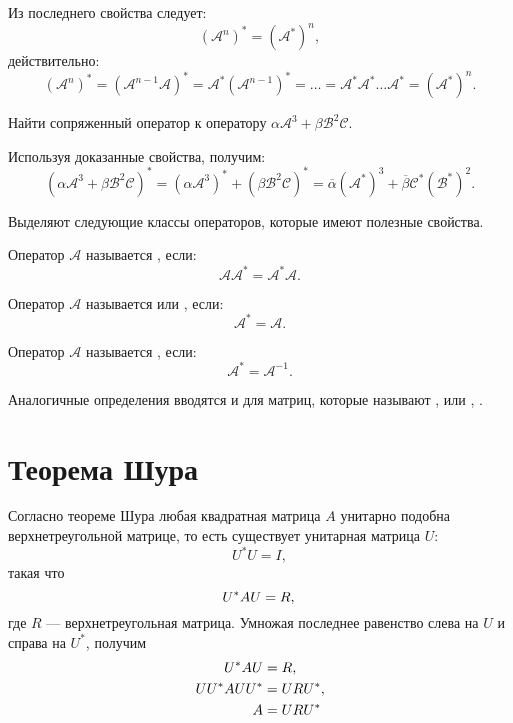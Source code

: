 Из последнего свойства следует:
\[
    \left ( \mathcal{A}^n \right )^* = \left ( \mathcal{A}^* \right )^n ,
\]
действительно:
\[
    \left ( \mathcal{A}^n \right )^*
    = \left ( \mathcal{A}^{n-1} \mathcal{A} \right )^*
    = \mathcal{A}^* \left ( \mathcal{A}^{n-1} \right )^*
    = \dots
    = \mathcal{A}^* \mathcal{A}^* \dots \mathcal{A}^*
    = \left ( \mathcal{A}^* \right )^n .
\]

\begin{example}
    Найти сопряженный оператор к оператору $\alpha \mathcal{A}^3 + \beta \mathcal{B}^2 \mathcal{C}$.

    Используя доказанные свойства, получим:
    \[
        \left ( \alpha \mathcal{A}^3 + \beta \mathcal{B}^2 \mathcal{C} \right )^*
        = \left ( \alpha \mathcal{A}^3 \right )^* + \left ( \beta \mathcal{B}^2 \mathcal{C} \right )^*
        = \overline{\alpha} \left ( \mathcal{A}^* \right )^3 + \overline{\beta} \mathcal{C}^* \left ( \mathcal{B}^* \right )^2 .
    \]
\end{example}

Выделяют следующие классы операторов, которые имеют полезные свойства.

Оператор $\mathcal{A}$ называется , если:
\[
    \mathcal{A} \mathcal{A}^* = \mathcal{A}^* \mathcal{A}.
\]

Оператор $\mathcal{A}$ называется  или , если:
\[
    \mathcal{A}^* = \mathcal{A}.
\]

Оператор $\mathcal{A}$ называется , если:
\[
    \mathcal{A}^* = \mathcal{A}^{-1}.
\]

Аналогичные определения вводятся и для матриц, которые называют ,  или , .


\section{Теорема Шура}

Согласно теореме Шура любая квадратная матрица $A$ унитарно подобна верхнетреугольной матрице, то есть существует унитарная матрица $U$:
\[
    U^* U = I,
\]
такая что
\[
    U^* A U = R, \\
\]
где $R$ --- верхнетреугольная матрица. Умножая последнее равенство слева на $U$ и справа на $U^*$, получим
\begin{align}
    U^* A U & = R,
    \notag \\
    U U^* A U U^* & = U R U^*,
    \notag \\
    A & = U R U^*
    \label{rayleigh:normal:schur_decomposition}
\end{align}

